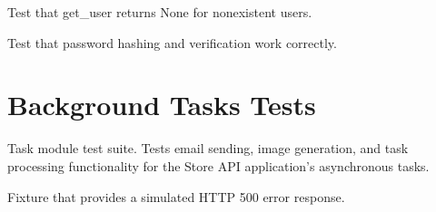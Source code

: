 \documentclass[letterpaper,10pt,openany,oneside,english]{sphinxmanual}
\begin{document}
\begin{savenotes}\begin{fulllineitems}
\label{\detokenize{modules/tests:storeapi.tests.test_security.test_get_user_not_found}}
\pysigstartsignatures
{}
\pysigstopsignatures
\sphinxAtStartPar
Test that get\_user returns None for non\sphinxhyphen{}existent users.

\end{fulllineitems}\end{savenotes}


\begin{savenotes}\begin{fulllineitems}
\label{\detokenize{modules/tests:storeapi.tests.test_security.test_password_hashes}}
\pysigstartsignatures
{}
\pysigstopsignatures
\sphinxAtStartPar
Test that password hashing and verification work correctly.

\end{fulllineitems}\end{savenotes}



\section{Background Tasks Tests}
\label{\detokenize{modules/tests:module-storeapi.tests.test_tasks}}\label{\detokenize{modules/tests:background-tasks-tests}}
\sphinxAtStartPar
Task module test suite.
Tests email sending, image generation, and task processing functionality
for the Store API application’s asynchronous tasks.

\begin{savenotes}\begin{fulllineitems}
\label{\detokenize{modules/tests:storeapi.tests.test_tasks.mock_http_error_response}}
\pysigstartsignatures
{}
\pysigstopsignatures
\sphinxAtStartPar
Fixture that provides a simulated HTTP 500 error response.

\end{fulllineitems}\end{savenotes}
\end{document}
